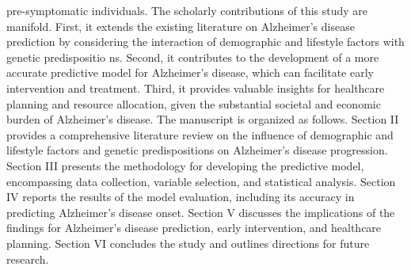 \documentclass[conference]{IEEEtran}
\begin{document}
pre-symptomatic individuals. The scholarly contributions of this study are manifold. First, it extends the existing literature on Alzheimer's disease prediction by considering the interaction of demographic and lifestyle factors with genetic predispositio ns. Second, it contributes to the development of a more accurate predictive model for Alzheimer's disease, which can facilitate early intervention and treatment. Third, it provides valuable insights for healthcare planning and resource allocation, given the substantial societal and economic burden of Alzheimer's disease. The manuscript is organized as follows. Section II provides a comprehensive literature review on the influence of demographic and lifestyle factors and genetic predispositions on Alzheimer's disease progression. Section III presents the methodology for developing the predictive model, encompassing data collection, variable selection, and statistical analysis. Section IV reports the results of the model evaluation, including its accuracy in predicting Alzheimer's disease onset. Section V discusses the implications of the findings for Alzheimer's disease prediction, early intervention, and healthcare planning. Section VI concludes the study and outlines directions for future research.
\end{document}
